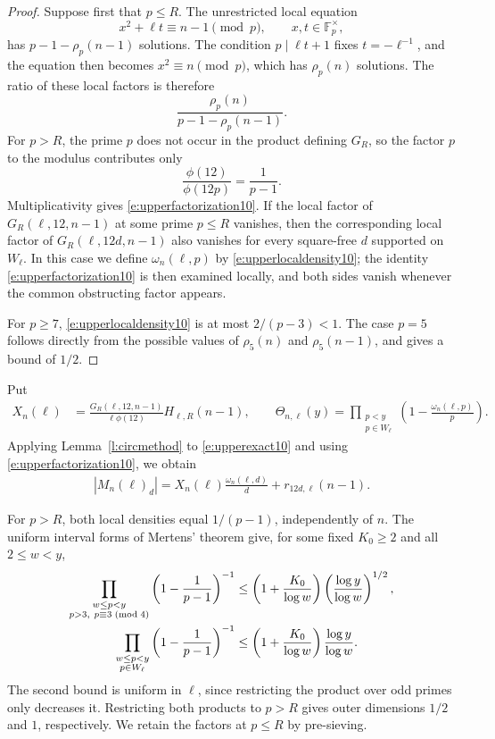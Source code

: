\documentclass[12pt,reqno]{amsart}
\numberwithin{equation}{section}
\theoremstyle{definition}
\theoremstyle{remark}
\begin{document}
\begin{proof}
Suppose first that \(p\leq R\).  The unrestricted local equation
\[
 x^2+\ell t\equiv n-1\pmod p,
 \qquad x,t\in\mathbb F_p^\times,
\]
has \(p-1-\rho_p(n-1)\) solutions.  The condition
\(p\mid\ell t+1\) fixes \(t=-\ell^{-1}\), and the equation then becomes
\(x^2\equiv n\pmod p\), which has \(\rho_p(n)\) solutions.  The ratio
of these local factors is therefore
\[
 \frac{\rho_p(n)}{p-1-\rho_p(n-1)}.
\]
For \(p>R\), the prime \(p\) does not occur in the product defining
\(G_R\), so the factor
\(p\) to the modulus contributes only
\[
 \frac{\phi(12)}{\phi(12p)}=\frac1{p-1}.
\]
Multiplicativity gives \eqref{e:upperfactorization10}. If the local factor of \(G_R(\ell,12,n-1)\) at some prime \(p\le R\)
vanishes, then the corresponding local factor of
\(G_R(\ell,12d,n-1)\) also vanishes for every square-free \(d\) supported
on \(W_\ell\).  In this case we define \(\omega_n(\ell,p)\) by
\eqref{e:upperlocaldensity10}; the identity
\eqref{e:upperfactorization10} is then examined locally, and both sides
vanish whenever the common obstructing factor appears.

For \(p\geq7\), \eqref{e:upperlocaldensity10} is at most
\(2/(p-3)<1\).  The case \(p=5\) follows directly from the possible
values of \(\rho_5(n)\) and \(\rho_5(n-1)\), and gives a bound of
\(1/2\).
\end{proof}
Put
\begin{align}\label{e:upperXomega10}
 X_n(\ell)
 &=
 \frac{G_R(\ell,12,n-1)}{\ell\phi(12)}
 H_{\ell,R}(n-1),\qquad
 \Theta_{n,\ell}(y)
 =
 \prod_{\substack{p<y\\p\in W_\ell}}
 \left(1-\frac{\omega_n(\ell,p)}p\right).
\end{align}
Applying Lemma~\ref{l:circmethod} to \eqref{e:upperexact10} and using
\eqref{e:upperfactorization10}, we obtain
\begin{align}\label{e:uppersequence10}
 |M_n(\ell)_d|
 =
 X_n(\ell)\frac{\omega_n(\ell,d)}d
 +r_{12d,\ell}(n-1).
\end{align}

For \(p>R\), both local densities equal \(1/(p-1)\),
independently of \(n\). The uniform interval forms of Mertens'
theorem give, for some fixed \(K_0\geq2\) and all \(2\leq w<y\),
\begin{align}\label{e:outerdimensions10}
 \prod_{\substack{w\leq p<y\\p>3,\ p\equiv3\;(\mathrm{mod}\;4)}}
 \left(1-\frac1{p-1}\right)^{-1}
 &\leq
 \left(1+\frac{K_0}{\log w}\right)
 \left(\frac{\log y}{\log w}\right)^{1/2},\notag\\
 \prod_{\substack{w\leq p<y\\p\in W_\ell}}
 \left(1-\frac1{p-1}\right)^{-1}
 &\leq
 \left(1+\frac{K_0}{\log w}\right)
 \frac{\log y}{\log w}.
\end{align}
The second bound is uniform in \(\ell\), since restricting the
product over odd primes only decreases it. Restricting both
products to \(p>R\) gives outer dimensions \(1/2\) and \(1\),
respectively. We retain the factors at \(p\leq R\) by pre-sieving.
\end{document}
